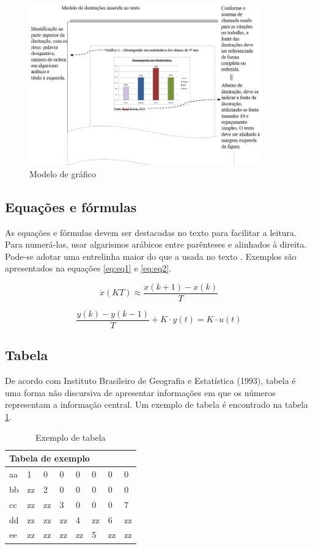 \begin{figure}[!ht]
    \centering
    \caption{Modelo de gráfico}   \label{fig:fig2}
    \includegraphics[width = 0.90\textwidth]{images/___fig2.png}
\end{figure}

\subsection{\textbf{Equações e fórmulas}}
As equações e fórmulas devem ser destacadas no texto para facilitar a leitura.  Para numerá-las, usar algarismos arábicos entre parênteses e alinhados à direita. Pode-se adotar uma entrelinha maior do que a usada no texto \cite{abnt14724}.
Exemplos são apresentados na equações \ref{eq:eq1} e \ref{eq:eq2}.

\begin{equation}
    \label{eq:eq1}
    \dot{x}(KT)\approx \frac{x(k+1)-x(k)}{T}
\end{equation}

\begin{equation}
    \label{eq:eq2}
    \frac{y(k)-y(k-1)}{T}+K\cdot y(t)=K\cdot u(t)
\end{equation}

\subsection{\textbf{Tabela}}

De acordo com Instituto Brasileiro de Geografia e Estatística (1993), tabela é uma forma não discursiva de apresentar informações em que os números representam a informação central. Um exemplo de tabela é encontrado na tabela \ref{tab:tab1}.
\begin{table}[h!]
\centering
\caption{Exemplo de tabela} \label{tab:tab1}
\begin{tabular}{llllllll} 
\hline
\multicolumn{8}{l}{Tabela de exemplo}  \\ 
\hline
aa & 1  & 0  & 0  & 0  & 0  & 0  & 0   \\ 
\hline
bb & zz & 2  & 0  & 0  & 0  & 0  & 0   \\ 
\hline
cc & zz & zz & 3  & 0  & 0  & 0  & 7   \\ 
\hline
dd & zz & zz & zz & 4  & zz & 6  & zz  \\ 
\hline
ee & zz & zz & zz & zz & 5  & zz & zz  \\
\hline
\end{tabular}
\end{table}
